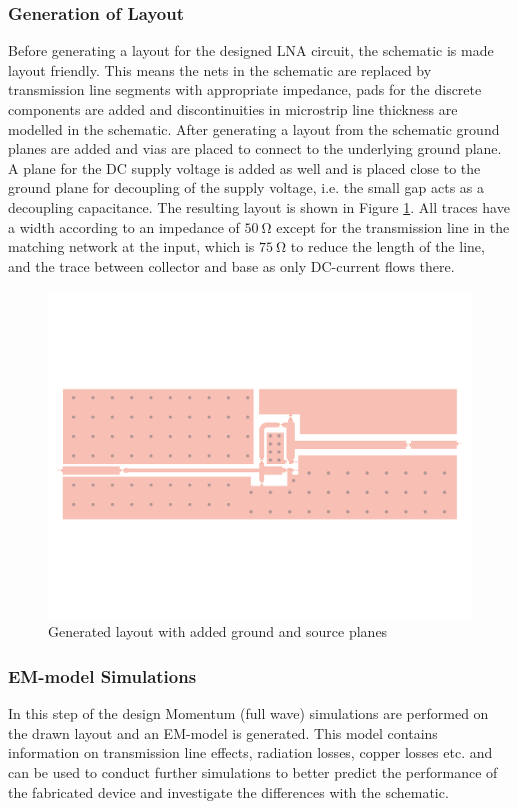 \documentclass[a4paper]{article}        %
\begin{document}
		\subsubsection{Generation of Layout}
			Before generating a layout for the designed LNA circuit, the schematic is made layout friendly. This means the nets in the schematic are replaced by transmission line segments with appropriate impedance, pads for the discrete components are added and discontinuities in microstrip line thickness are modelled in the schematic. After generating a layout from the schematic ground planes are added and vias are placed to connect to the underlying ground plane. A plane for the DC supply voltage is added as well and is placed close to the ground plane for decoupling of the supply voltage, i.e. the small gap acts as a decoupling capacitance. The resulting layout is shown in Figure \ref{fig:lna_layout}. All traces have a width according to an impedance of $\SI{50}{\ohm}$ except for the transmission line in the matching network at the input, which is $\SI{75}{\ohm}$ to reduce the length of the line, and the trace between collector and base as only DC-current flows there. 

			\begin{figure}[H]
			\centering
				\includegraphics[width=\textwidth]{fig/LNA/LNA_layout.pdf}
				\caption{Generated layout with added ground and source planes}
				\label{fig:lna_layout}
			\end{figure}

		\subsubsection{EM-model Simulations}
			In this step of the design Momentum (full wave) simulations are performed on the drawn layout and an EM-model is generated. This model contains information on transmission line effects, radiation losses, copper losses etc. and can be used to conduct further simulations to better predict the performance of the fabricated device and investigate the differences with the schematic. \\
\end{document}
